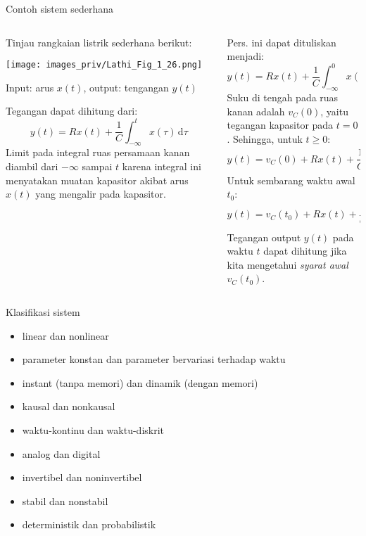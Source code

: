 \begin{frame}{Contoh sistem sederhana}

\fontsize{9}{10}\selectfont

\begin{columns}
  \begin{column}{0.5\textwidth}
  Tinjau rangkaian listrik sederhana berikut:
  
  {\centering
  \texttt{[image: images\_priv/Lathi\_Fig\_1\_26.png]}
  \par}

  Input: arus $x(t)$, output: tengangan $y(t)$
  
  Tegangan dapat dihitung dari:
  $$
  y(t) = R x(t) + \frac{1}{C} \int_{-\infty}^{t} x(\tau)\,\mathrm{d}\tau
  $$
  Limit pada integral ruas persamaan kanan diambil dari $-\infty$ sampai $t$ karena integral ini
  menyatakan muatan kapasitor akibat arus $x(t)$ yang mengalir pada kapasitor.
  \end{column}
  \begin{column}{0.5\textwidth}
  Pers. ini dapat dituliskan menjadi:
  $$
  y(t) = R x(t) + \frac{1}{C} \int_{-\infty}^{0} x(\tau)\,\mathrm{d}\tau + 
    \frac{1}{C} \int_{0}^{t} x(\tau)\,\mathrm{d}\tau
  $$
  Suku di tengah pada ruas kanan adalah $v_{C}(0)$, yaitu tegangan kapasitor pada $t=0$.
  Sehingga, untuk $t \geq 0$:
  $$
  y(t) = v_{C}(0) + R x(t) + \frac{1}{C} \int_{0}^{t} x(\tau)\,\mathrm{d}\tau
  $$
  Untuk sembarang waktu awal $t_0$:
  $$
  y(t) = v_{C}(t_{0}) + R x(t) + \frac{1}{C} \int_{t_{0}}^{t} x(\tau)\,\mathrm{d}\tau
  $$
  Tegangan output $y(t)$ pada waktu $t$ dapat dihitung jika kita mengetahui
  \textit{syarat awal} $v_{C}(t_0)$.
  \end{column}

\end{columns}

\end{frame}



\begin{frame}{Klasifikasi sistem}
\begin{itemize}
\item linear dan nonlinear
\item parameter konstan dan parameter bervariasi terhadap waktu
\item instant (tanpa memori) dan dinamik (dengan memori)
\item kausal dan nonkausal
\item waktu-kontinu dan waktu-diskrit
\item analog dan digital
\item invertibel dan noninvertibel
\item stabil dan nonstabil
\item deterministik dan probabilistik
\end{itemize}
\end{frame}


